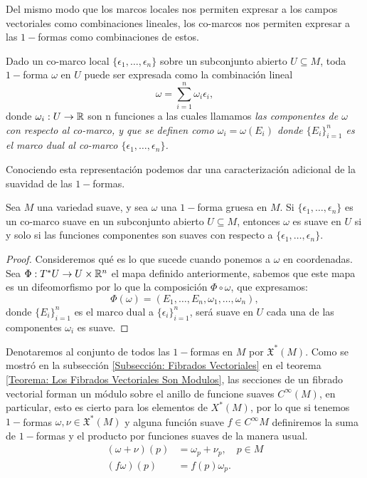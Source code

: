 Del mismo modo que los marcos locales nos permiten expresar a los campos vectoriales como combinaciones lineales, los co-marcos nos permiten expresar a las $1-$formas como combinaciones de estos.

Dado un co-marco local $\{\epsilon_1,\ldots,\epsilon_n\}$ sobre un subconjunto abierto $U \subseteq M$, toda $1-$forma $\omega$ en $U$ puede ser expresada como la combinación lineal
\[
	\omega = \sum_{i=1}^{n} \omega_i \epsilon_i,
\]
donde $\omega_i: U \to \mathbb{R}$ son n funciones a las cuales llamamos \it{las componentes de $\omega$ con respecto al co-marco}, y que se definen como $\omega_i = \omega(E_i)$ donde $\{E_i\}_{i=1}^n$ es el marco dual al co-marco $\{\epsilon_1,\ldots,\epsilon_n\}$.

Conociendo esta representación podemos dar una caracterización adicional de la suavidad de las $1-$formas.

\begin{theorem}
	Sea $M$ una variedad suave, y sea $\omega$ una $1-$forma gruesa en $M$. Si $\{\epsilon_1,\ldots,\epsilon_n\}$ es un co-marco suave en un subconjunto abierto $U \subseteq M$, entonces $\omega$ es suave en $U$ si y solo si las funciones componentes son suaves con respecto a $\{\epsilon_1, \ldots, \epsilon_n\}$.
\end{theorem}

\begin{proof}
	Consideremos qué es lo que sucede cuando ponemos a $\omega$ en coordenadas. Sea $\Phi: T^{*}U \to U \times \mathbb{R}^n$ el mapa definido anteriormente, sabemos que este mapa es un difeomorfismo por lo que la composición $\Phi \circ \omega$, que expresamos:
	\[
		\Phi(\omega) = (E_1, \ldots, E_n, \omega_1, \ldots, \omega_n),
	\]
	donde $\{E_i\}_{i=1}^n$ es el marco dual a $\{\epsilon_i\}_{i=1}^n$, será suave en $U$ cada una de las componentes $\omega_i$ es suave.
\end{proof}

Denotaremos al conjunto de todos las $1-$formas en $M$ por $\mathfrak{X}^*(M)$. Como se mostró en la subsección \ref{Subsección: Fibrados Vectoriales} en el teorema \ref{Teorema: Los Fibrados Vectoriales Son Modulos}, las secciones de un fibrado vectorial forman un módulo sobre el anillo de funcione suaves $C^{\infty}(M)$, en particular, esto es cierto para los elementos de $X^{*}(M)$, por lo que si tenemos $1-$formas $\omega,\nu \in \mathfrak{X}^*(M)$ y alguna función suave $f \in C^{\infty}M$ definiremos la suma de $1-$formas y el producto por funciones suaves de la manera usual.
\begin{align*}
	(\omega + \nu)(p) & = \omega_p + \nu_p, \quad p \in M \\
	(f\omega)(p)      & = f(p)\omega_p.
\end{align*}
